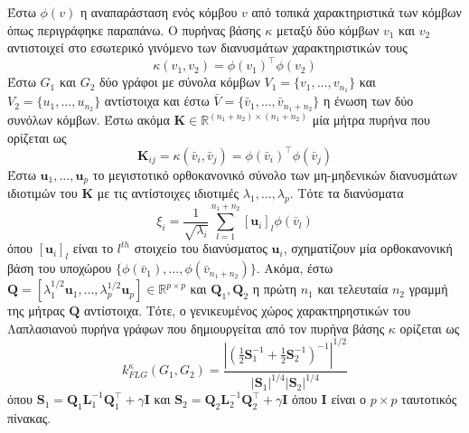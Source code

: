 Έστω $\phi(v)$ η αναπαράσταση ενός κόμβου $v$ από τοπικά χαρακτηριστικά των κόμβων όπως περιγράφηκε παραπάνω.
Ο πυρήνας βάσης $\kappa$ μεταξύ δύο κόμβων $v_1$ και $v_2$ αντιστοιχεί στο εσωτερικό γινόμενο των διανυσμάτων χαρακτηριστικών τους
\begin{equation}
    \kappa(v_1, v_2) = \phi(v_1)^\top \phi(v_2) 
\end{equation}
Έστω $G_1$ και $G_2$ δύο γράφοι με σύνολα κόμβων $V_1 = \{ v_1, \ldots, v_{n_1}\}$ και $V_2 = \{ u_1, \ldots, u_{n_2} \}$ αντίστοιχα και έστω $\bar{V} = \{ \bar{v}_1, \ldots, \bar{v}_{n_1+n_2} \}$ η ένωση των δύο συνόλων κόμβων.
Έστω ακόμα $\mathbf{K} \in \mathbb{R}^{(n_1+n_2) \times (n_1+n_2)}$ μία μήτρα πυρήνα που ορίζεται ως
\begin{equation}
    \mathbf{K}_{ij} = \kappa(\bar{v}_i, \bar{v}_j) = \phi(\bar{v}_i)^\top \phi(\bar{v}_j)
\end{equation}
Έστω $\mathbf{u}_1, \ldots, \mathbf{u}_p$ το μεγιστοτικό ορθοκανονικό σύνολο των μη-μηδενικών διανυσμάτων ιδιοτιμών του $\mathbf{K}$
με τις αντίστοιχες ιδιοτιμές $\lambda_1, \ldots, \lambda_p$.
Τότε τα διανύσματα
\begin{equation}
    \xi_i = \frac{1}{\sqrt{\lambda_i}} \sum_{l=1}^{n_1+n_2} [\mathbf{u}_i]_l \phi(\bar{v}_l)
\end{equation}
όπου $[\mathbf{u}_i]_l$ είναι το $l^{th}$ στοιχείο του διανύσματος $\mathbf{u}_i$, σχηματίζουν μία ορθοκανονική βάση του υποχώρου $\{ \phi(\bar{v}_1), \ldots, \phi(\bar{v}_{n_1+n_2}) \}$.
Ακόμα, έστω $\mathbf{Q} = [ \lambda_1^{1/2} \mathbf{u}_1, \ldots,\lambda_p^{1/2} \mathbf{u}_p ] \in \mathbb{R}^{p \times p}$ και $\mathbf{Q}_1, \mathbf{Q}_2$ η πρώτη $n_1$ και τελευταία $n_2 $ γραμμή της μήτρας $\mathbf{Q}$ αντίστοιχα.
Τότε, ο γενικευμένος χώρος χαρακτηρηστικών του Λαπλασιανού πυρήνα γράφων που δημιουργείται από τον πυρήνα βάσης $\kappa$ ορίζεται ως
\begin{equation*}
    k_{FLG}^\kappa(G_1, G_2) = \frac{| (\frac{1}{2} \mathbf{S}_1^{-1} + \frac{1}{2} \mathbf{S}_2^{-1} )^{-1} |^{1/2}}{|\mathbf{S}_1|^{1/4} |\mathbf{S}_2|^{1/4}} 
\end{equation*}
όπου $\mathbf{S}_1 = \mathbf{Q}_1 \mathbf{L}_1^{-1} \mathbf{Q}_1^\top + \gamma \mathbf{I}$ και $\mathbf{S}_2 = \mathbf{Q}_2 \mathbf{L}_2^{-1} \mathbf{Q}_2^\top + \gamma \mathbf{I}$ όπου $\mathbf{I}$ είναι ο $p \times p$ ταυτοτικός πίνακας.

